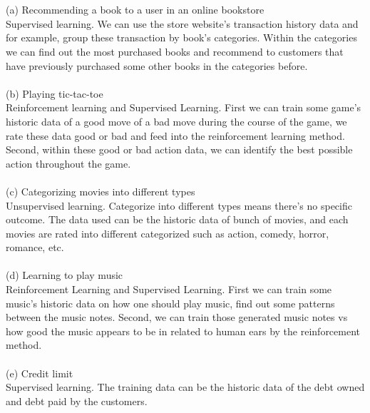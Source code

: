 \documentclass[12pt]{article}
\begin{document}
\newpage
{} \\\\
\indent (a) Recommending a book to a user in an online bookstore\\
\indent Supervised learning. We can use the store website's transaction history data and for example, group these transaction by book's categories. Within the categories we can find out the most purchased books and recommend to customers that have previously purchased some other books in the categories before.\\\\
\indent (b) Playing tic-tac-toe\\
\indent Reinforcement learning and Supervised Learning. First we can train some game's historic data of a good move of a bad move during the course of the game, we rate these data good or bad and feed into the reinforcement learning method. Second, within these good or bad action data, we can identify the best possible action throughout the game.\\\\
\indent (c) Categorizing movies into different types\\
\indent Unsupervised learning. Categorize into different types means there's no specific outcome. The data used can be the historic data of bunch of movies, and each movies are rated into different categorized such as action, comedy, horror, romance, etc.\\\\
\indent (d) Learning to play music\\
\indent Reinforcement Learning and Supervised Learning. First we can train some music's historic data on how one should play music, find out some patterns between the music notes. Second, we can train those generated music notes vs how good the music appears to be in related to human ears by the reinforcement method.\\\\
\indent (e) Credit limit\\
\indent Supervised learning. The training data can be the historic data of the debt owned and debt paid by the customers.\\\\
\end{document}
